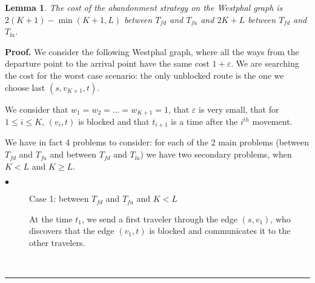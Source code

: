 \documentclass[letter-size, 11pt]{article}
\newtheorem{lemma}{Lemma}
\newenvironment{proof}[1][Proof]{\textbf{#1.} }{\ \rule{0.5em}{0.5em}}
\begin{document}
\begin{lemma} The cost of the abandonment strategy on the Westphal graph is $2(K+1) - \min(K+1,L)$ between $T_{fd}$ and $T_{fa}$ and $2K+L$ between $T_{fd}$ and $T_{la}$.
\end{lemma}


\begin{proof}We consider the following Westphal graph, where all the ways from the departure point to the arrival point have the same cost $1+\varepsilon$. We are searching the cost for the worst case scenario: the only unblocked route is the one we choose last $(s,v_{K+1},t)$.

\begin{center}
\end{center}

We consider that $w_1 = w_2 = ... = w_{K+1} = 1$, that $\varepsilon$ is very small, that for $1\leq i \leq K$, $(v_i,t)$ is blocked and that $t_{i+1}$ is a time after the $i^{th}$ movement.

We have in fact 4 problems to consider: for each of the 2 main problems (between $T_{fd}$ and $T_{fa}$ and between $T_{fd}$ and $ T_{la}$) we have two secondary problems, when $K<L$ and ${K \geq L}$.

\begin{description}
\item[$\bullet$] Case 1: between $T_{fd}$ and $T_{fa}$ and $K<L$

At the time $t_1$, we send a first traveler through the edge $(s,v_1)$, who discovers that the edge $(v_1,t)$ is blocked and communicates it to the other travelers.


\end{description}
\end{proof}
\end{document}
